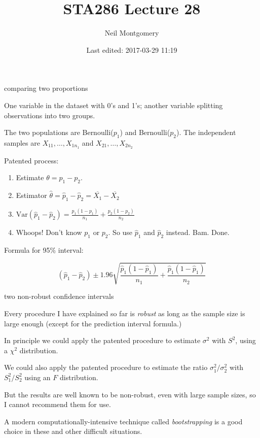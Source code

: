 \documentclass[ignorenonframetext,aspectratio=169]{beamer}
\title{STA286 Lecture 28}
\author{Neil Montgomery}
\date{Last edited: 2017-03-29 11:19}
\newcommand\V[1]{\text{Var}\!\left(#1\right)}
\newcommand\ol{\overline}
\begin{document}
\frame{\titlepage}

\begin{frame}{comparing two proportions}

One variable in the dataset with 0's and 1's; another variable splitting
observations into two groups.

The two populations are Bernoulli(\(p_1\)) and Bernoulli(\(p_2\)). The
independent samples are \(X_{11},\ldots,X_{1n_1}\) and
\(X_{21},\ldots,X_{2n_2}\)

Patented process:

\begin{enumerate}[<+->]
\def\labelenumi{\arabic{enumi}.}
\item
  Estimate \(\theta = p_1 - p_2\).
\item
  Estimator \(\hat\theta = \hat p_1 - \hat p_2 = \ol{X_1} - \ol{X_2}\)
\item
  \(\V{\hat p_1 - \hat p_2} = \frac{p_1(1-p_1)}{n_1} + \frac{p_2(1-p_2)}{n_2}\)
\item
  Whoops! Don't know \(p_1\) or \(p_2\). So use \(\hat p_1\) and
  \(\hat p_2\) instead. Bam. Done.
\end{enumerate}

\pause Formula for 95\% interval:

\[(\hat p_1 - \hat p_2) \pm 1.96\sqrt{\frac{\hat p_1(1-\hat p_1)}{n_1} + \frac{\hat p_1(1- \hat p_1)}{n_2}}\]

\end{frame}

\begin{frame}{two non-robust confidence intervals}

Every procedure I have explained so far is \textit{robust} as long as
the sample size is large enough (except for the prediction interval
formula.)

In principle we could apply the patented procedure to estimate
\(\sigma^2\) with \(S^2\), using a \(\chi^2\) distribution.

We could also apply the patented procedure to estimate the ratio
\(\sigma_1^2/\sigma_2^2\) with \(S_1^2/S_2^2\) using an \(F\)
distribution.

But the results are well known to be non-robust, even with large sample
sizes, so I cannot recommend them for use.

\pause A modern computationally-intensive technique called
\textit{bootstrapping} is a good choice in these and other difficult
situations.

\end{frame}
\end{document}

